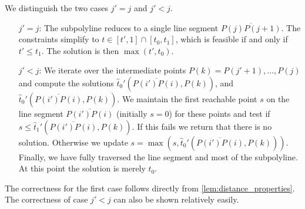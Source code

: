 We distinguish the two cases \(j' = j\) and \(j' < j\). 
\begin{enumerate}
	\item[\(j' = j\): ] The subpolyline reduces to a single line segment \(\overline{P(j)P(j+1)}\). The constraints simplify to \(t \in [t', 1] \cap [t_0, t_1]\), which is feasible if and only if \(t' \leq t_1\). The solution is then \(\max(t', t_0)\).

	\item[\(j' < j\): ] We iterate over the intermediate points \(P(k) = P(j'+1), \dots, P(j)\) and compute the solutions \(\hat t_0'(\overline{P(i')P(i)}, P(k))\), and \(\hat t_0'(\overline{P(i')P(i)}, P(k))\). We maintain the first reachable point \(s\) on the line segment \(\overline{P(i')P(i)}\) (initially \(s = 0\)) for these points and test if \(s \leq \hat t_1'(\overline{P(i')P(i)}, P(k))\). If this fails we return that there is no solution. Otherwise we update \(s = \max(s, \hat t_0'(\overline{P(i')P(i)}, P(k)))\). Finally, we have fully traversed the line segment and most of the subpolyline. At this point the solution is merely \(t_0\).
\end{enumerate}

The correctness for the first case follows directly from \cref{lem:distance_properties}. The correctness of case \(j' < j\) can also be shown relatively easily. 

